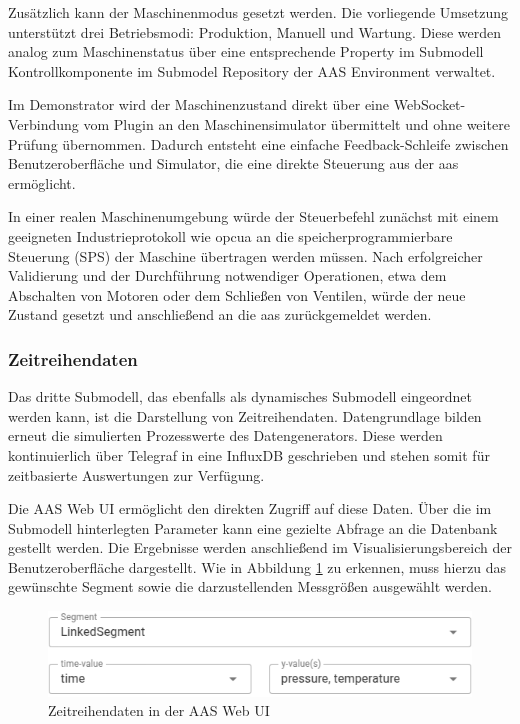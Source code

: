 Zusätzlich kann der Maschinenmodus gesetzt werden. 
Die vorliegende Umsetzung unterstützt drei Betriebsmodi: Produktion, Manuell und Wartung. 
Diese werden analog zum Maschinenstatus über eine entsprechende Property im Submodell Kontrollkomponente im Submodel Repository der AAS Environment verwaltet.

Im Demonstrator wird der Maschinenzustand direkt über eine WebSocket-Verbindung vom Plugin an den Maschinensimulator übermittelt und ohne weitere Prüfung übernommen. 
Dadurch entsteht eine einfache Feedback-Schleife zwischen Benutzeroberfläche und Simulator, die eine direkte Steuerung aus der \acs{aas} ermöglicht.

In einer realen Maschinenumgebung würde der Steuerbefehl zunächst mit einem geeigneten Industrieprotokoll wie \acs{opcua} an die speicherprogrammierbare Steuerung (SPS) der Maschine übertragen werden müssen. 
Nach erfolgreicher Validierung und der Durchführung notwendiger Operationen, etwa dem Abschalten von Motoren oder dem Schließen von Ventilen, würde der neue Zustand gesetzt und anschließend an die \acs{aas} zurückgemeldet werden.

\subsubsection*{Zeitreihendaten}
\vspace{-0.5em}
Das dritte Submodell, das ebenfalls als dynamisches Submodell eingeordnet werden kann, ist die Darstellung von Zeitreihendaten. 
Datengrundlage bilden erneut die simulierten Prozesswerte des Datengenerators.
Diese werden kontinuierlich über Telegraf in eine InfluxDB geschrieben und stehen somit für zeitbasierte Auswertungen zur Verfügung.

Die AAS Web UI ermöglicht den direkten Zugriff auf diese Daten. 
Über die im Submodell hinterlegten Parameter kann eine gezielte Abfrage an die Datenbank gestellt werden. 
Die Ergebnisse werden anschließend im Visualisierungsbereich der Benutzeroberfläche dargestellt. 
Wie in Abbildung \ref{fig:KonfigurationZeitreihen} zu erkennen, muss hierzu das gewünschte Segment sowie die darzustellenden Messgrößen ausgewählt werden.

\begin{figure}[htbp]
    \centering
        \includegraphics{Bilder/Ergebnisse/DynamischeDaten/ZeitreihenDaten/Konfiguration.png}
    \caption{Zeitreihendaten in der AAS Web UI}
    \label{fig:KonfigurationZeitreihen}
\end{figure}

